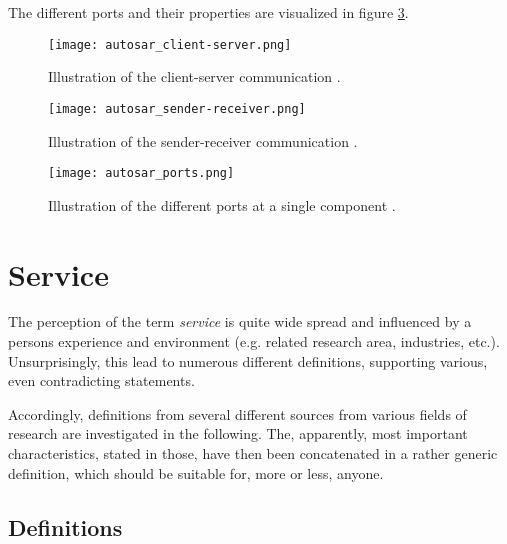 The different ports and their properties are visualized in figure \ref{fig:autosar_ports}. 

\begin{figure}[ht]
\centering
\texttt{[image: autosar\_client-server.png]}
\caption{Illustration of the client-server communication \cite{autosar_intro}.}
\label{fig:autosar_client-server}
\end{figure}

\begin{figure}[ht]
\centering
\texttt{[image: autosar\_sender-receiver.png]}
\caption{Illustration of the sender-receiver communication \cite{autosar_intro}.}
\label{fig:autosar_sender-receiver}
\end{figure}

\begin{figure}[ht]
\centering
\texttt{[image: autosar\_ports.png]}
\caption{Illustration of the different ports at a single component \cite{autosar_intro}.}
\label{fig:autosar_ports}
\end{figure}









\section{Service}
\label{ch:service} 
The perception of the term \emph{service} is quite wide spread and influenced by a persons experience and environment (e.g. related research area, industries, etc.). Unsurprisingly, this lead to numerous different definitions, supporting various, even contradicting statements.

Accordingly, definitions from several different sources from various fields of research are investigated in the following. The, apparently, most important characteristics, stated in those, have then been concatenated in a rather generic definition, which should be suitable for, more or less, anyone.

\subsection{Definitions}

